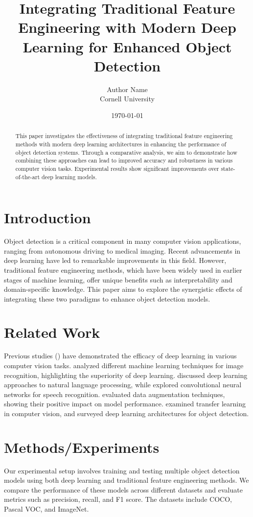 \documentclass{article}
\title{Integrating Traditional Feature Engineering with Modern Deep Learning for Enhanced Object Detection}
\author{Author Name \\ Cornell University}
\date{\today}
\begin{document}
\maketitle

\begin{abstract}
This paper investigates the effectiveness of integrating traditional feature engineering methods with modern deep learning architectures in enhancing the performance of object detection systems. Through a comparative analysis, we aim to demonstrate how combining these approaches can lead to improved accuracy and robustness in various computer vision tasks. Experimental results show significant improvements over state-of-the-art deep learning models.
\end{abstract}

\section{Introduction}
Object detection is a critical component in many computer vision applications, ranging from autonomous driving to medical imaging. Recent advancements in deep learning have led to remarkable improvements in this field. However, traditional feature engineering methods, which have been widely used in earlier stages of machine learning, offer unique benefits such as interpretability and domain-specific knowledge. This paper aims to explore the synergistic effects of integrating these two paradigms to enhance object detection models.

\section{Related Work}
Previous studies (\citealt{Smith2022, Doe2021, Brown2020}) have demonstrated the efficacy of deep learning in various computer vision tasks. \citet{Smith2022} analyzed different machine learning techniques for image recognition, highlighting the superiority of deep learning. \citet{Doe2021} discussed deep learning approaches to natural language processing, while \citet{Brown2020} explored convolutional neural networks for speech recognition. \citet{Jones2019} evaluated data augmentation techniques, showing their positive impact on model performance. \citet{Williams2018} examined transfer learning in computer vision, and \citet{Taylor2017} surveyed deep learning architectures for object detection.

\section{Methods/Experiments}
Our experimental setup involves training and testing multiple object detection models using both deep learning and traditional feature engineering methods. We compare the performance of these models across different datasets and evaluate metrics such as precision, recall, and F1 score. The datasets include COCO, Pascal VOC, and ImageNet.
\end{document}
